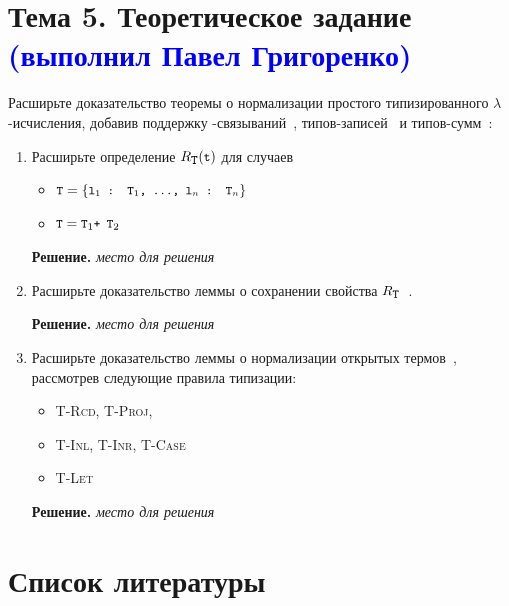 \documentclass[dvipsnames]{article}
\let\smallcodeOrig\smallcode
\renewcommand{\smallcode}[2][]{%
  \ifmmode
    \if\relax\detokenize{#1}\relax
      \mathchoice{\mbox{\normalfont\small\ttfamily #2}}{\mbox{\normalfont\small\ttfamily #2}}{\mbox{\normalfont\small\ttfamily #2}}{\mbox{\normalfont\small\ttfamily #2}}%
    \else
      \mathchoice{\mbox{\normalfont\small\ttfamily #2}}{\mbox{\normalfont\small\ttfamily #2}}{\mbox{\normalfont\small\ttfamily #2}}{\mbox{\normalfont\small\ttfamily #2}}%
    \fi
  \else
    \smallcodeOrig[#1]{#2}%
  \fi}
\let\codeOrig\code
\renewcommand{\code}[2][]{%
  \ifmmode
    \if\relax\detokenize{#1}\relax
      \mathchoice{\mbox{\normalfont\small\ttfamily #2}}{\mbox{\normalfont\small\ttfamily #2}}{\mbox{\normalfont\small\ttfamily #2}}{\mbox{\normalfont\small\ttfamily #2}}%
    \else
      \mathchoice{\mbox{\normalfont\small\ttfamily #2}}{\mbox{\normalfont\small\ttfamily #2}}{\mbox{\normalfont\small\ttfamily #2}}{\mbox{\normalfont\small\ttfamily #2}}%
    \fi
  \else
    \codeOrig[#1]{#2}%
  \fi}
\begin{document}
\pagestyle{fancy}
\fancyhf{}

\section*{Тема 5. Теоретическое задание \textcolor{blue}{(выполнил Павел Григоренко)}}%

Расширьте доказательство теоремы о нормализации простого типизированного $\lambda$-исчисления,
добавив поддержку \code{let}-связываний~\cite[Рис.~11.4]{TaPL-ru}, типов-записей~\cite[Рис.~11.7]{TaPL-ru} и типов-сумм~\cite[Рис.~11.9]{TaPL-ru}:

\begin{enumerate}
  \item Расширьте определение $R_{\smallcode{T}}(\code{t})$ для случаев
  \begin{itemize}
    \item $\code{T} = \{\code{l$_1$ : T$_1$, …, l$_n$ : T$_n$}\}$
    \item $\code{T} = \code{T}_1\code{ + T}_2$
  \end{itemize}

  \color{blue}
  \textbf{Решение.}
  \emph{место для решения}
  \color{black}

  \clearpage

  \item Расширьте доказательство леммы о сохранении свойства $R_{\smallcode{T}}$~\cite[Лемма~12.1.4]{TaPL-ru}.

  \color{blue}
  \textbf{Решение.}
  \emph{место для решения}
  \color{black}

  \clearpage

  \item Расширьте доказательство леммы о нормализации открытых термов~\cite[Лемма~12.1.5]{TaPL-ru},
  рассмотрев следующие правила типизации:
  \begin{itemize}
    \item \textsc{T-Rcd}, \textsc{T-Proj},
    \item \textsc{T-Inl}, \textsc{T-Inr}, \textsc{T-Case}
    \item \textsc{T-Let}
  \end{itemize}

  \color{blue}
  \textbf{Решение.}
  \emph{место для решения}
  \color{black}
\end{enumerate}

\section*{Список литературы}
\printbibliography[heading=none]
\end{document}
